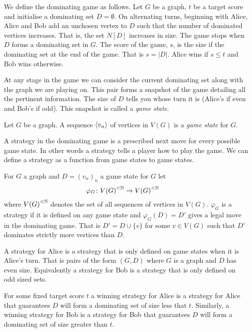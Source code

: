 We define the dominating game as follows. Let $G$ be a graph, $t$ be a target score and initialise a dominating set $D=\emptyset$. On alternating turns, beginning with Alice, Alice and Bob add an unchosen vertex to $D$ such that the number of dominated vertices increases. That is, the set $N[D]$ increases in size. The game stops when $D$ forms a dominating set in $G$. The score of the game, $s$, is the size if the dominating set at the end of the game. That is $s=|D|$. Alice wins if $s\leq t$ and Bob wins otherwise.

At any stage in the game we can consider the current dominating set along with the graph we are playing on. This pair forms a snapshot of the game detailing all the pertinent information. The size of $D$ tells you whose turn it is (Alice's if even and Bob's if odd). This snapshot is called a \textit{game state}. 

\begin{definition}
    Let $G$ be a graph. A sequence $\left\langle v_n \right\rangle$ of vertices in $V(G)$ is a \textit{game state} for $G$.
\end{definition}

A strategy in the dominating game is a prescribed next move for every possible game state. In other words a strategy tells a player how to play the game. We can define a strategy as a function from game states to game states. 

\begin{definition}
    For $G$ a graph and $D=(v_n)_n$ a game state for $G$ let
    \begin{align*}        
        \varphi_G &\colon {V(G)}^{<\mathbb{N}} \to {V(G)}^{<\mathbb{N}} 
    \end{align*}
    where ${V(G)}^{<\mathbb{N}}$ denotes the set of all sequences of vertices in $V(G)$. $\varphi_G$ is a strategy if it is defined on any game state and $\varphi_G(D)=D'$ gives a legal move in the dominating game. That is $D'=D\cup \{v\}$ for some $v\in V(G)$ such that $D'$ dominates strictly more vertices than $D$. 
\end{definition}

A strategy for Alice is a strategy that is only defined on game states when it is Alice's turn. That is pairs of the form $(G,D)$ where $G$ is a graph and $D$ has even size. Equivalently a strategy for Bob is a strategy that is only defined on odd sized sets. 

For some fixed target score $t$ a winning strategy for Alice is a strategy for Alice that guarantees $D$ will form a dominating set of size less that $t$. Similarly, a winning strategy for Bob is a strategy for Bob that guarantees $D$ will form a dominating set of size greater than $t$.

